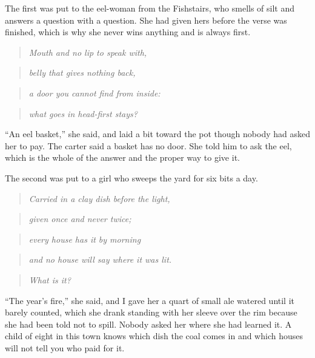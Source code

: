 \documentclass{design/chronicle}
\begin{document}
The first was put to the eel-woman from the Fishstairs, who smells of silt and answers a question with a question. She had given hers before the verse was finished, which is why she never wins anything and is always first.

\begin{quote}\itshape Mouth and no lip to speak with,\end{quote}

\begin{quote}\itshape belly that gives nothing back,\end{quote}

\begin{quote}\itshape a door you cannot find from inside:\end{quote}

\begin{quote}\itshape what goes in head-first stays?\end{quote}

“An eel basket,” she said, and laid a bit toward the pot though nobody had asked her to pay. The carter said a basket has no door. She told him to ask the eel, which is the whole of the answer and the proper way to give it.

The second was put to a girl who sweeps the yard for six bits a day.

\begin{quote}\itshape Carried in a clay dish before the light,\end{quote}

\begin{quote}\itshape given once and never twice;\end{quote}

\begin{quote}\itshape every house has it by morning\end{quote}

\begin{quote}\itshape and no house will say where it was lit.\end{quote}

\begin{quote}\itshape What is it?\end{quote}

“The year’s fire,” she said, and I gave her a quart of small ale watered until it barely counted, which she drank standing with her sleeve over the rim because she had been told not to spill. Nobody asked her where she had learned it. A child of eight in this town knows which dish the coal comes in and which houses will not tell you who paid for it.
\end{document}
